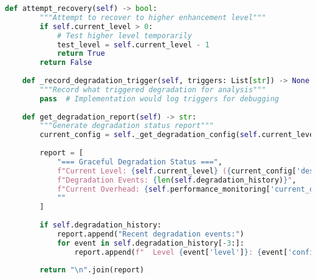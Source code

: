 \begin{lstlisting}[language=Python, caption=Graceful Degradation for Worst-Case Scenarios]
    def attempt_recovery(self) -> bool:
        """Attempt to recover to higher enhancement level"""
        if self.current_level > 0:
            # Test higher level temporarily
            test_level = self.current_level - 1
            return True
        return False
    
    def _record_degradation_trigger(self, triggers: List[str]) -> None:
        """Record what triggered degradation for analysis"""
        pass  # Implementation would log triggers for debugging
    
    def get_degradation_report(self) -> str:
        """Generate degradation status report"""
        current_config = self._get_degradation_config(self.current_level)
        
        report = [
            "=== Graceful Degradation Status ===",
            f"Current Level: {self.current_level} ({current_config['description']})",
            f"Degradation Events: {len(self.degradation_history)}",
            f"Current Overhead: {self.performance_monitoring['current_overhead']:.2f}x",
            ""
        ]
        
        if self.degradation_history:
            report.append("Recent degradation events:")
            for event in self.degradation_history[-3:]:
                report.append(f"  Level {event['level']}: {event['config']['description']}")
        
        return "\n".join(report)
\end{lstlisting}

